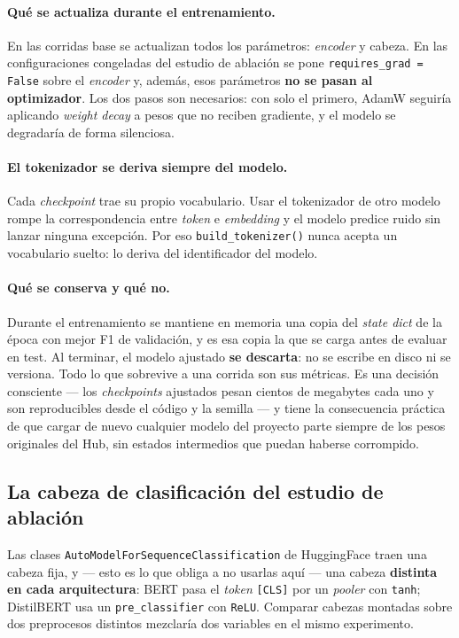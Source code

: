 \paragraph{Qué se actualiza durante el entrenamiento.} En las corridas base
se actualizan todos los parámetros: \textit{encoder} y cabeza. En las
configuraciones congeladas del estudio de ablación se pone
\texttt{requires\_grad = False} sobre el \textit{encoder} y, además, esos
parámetros \textbf{no se pasan al optimizador}. Los dos pasos son necesarios:
con solo el primero, AdamW seguiría aplicando \textit{weight decay} a pesos
que no reciben gradiente, y el modelo se degradaría de forma silenciosa.

\paragraph{El tokenizador se deriva siempre del modelo.} Cada
\textit{checkpoint} trae su propio vocabulario. Usar el tokenizador de otro
modelo rompe la correspondencia entre \textit{token} e \textit{embedding} y
el modelo predice ruido sin lanzar ninguna excepción. Por eso
\texttt{build\_tokenizer()} nunca acepta un vocabulario suelto: lo deriva del
identificador del modelo.

\paragraph{Qué se conserva y qué no.} Durante el entrenamiento se mantiene en
memoria una copia del \textit{state dict} de la época con mejor F1 de
validación, y es esa copia la que se carga antes de evaluar en test. Al
terminar, el modelo ajustado \textbf{se descarta}: no se escribe en disco ni
se versiona. Todo lo que sobrevive a una corrida son sus métricas. Es una
decisión consciente --- los \textit{checkpoints} ajustados pesan cientos de
megabytes cada uno y son reproducibles desde el código y la semilla --- y
tiene la consecuencia práctica de que cargar de nuevo cualquier modelo del
proyecto parte siempre de los pesos originales del Hub, sin estados
intermedios que puedan haberse corrompido.

\subsection{La cabeza de clasificación del estudio de ablación}

Las clases \texttt{AutoModelForSequenceClassification} de HuggingFace traen
una cabeza fija, y --- esto es lo que obliga a no usarlas aquí --- una cabeza
\textbf{distinta en cada arquitectura}: BERT pasa el \textit{token}
\texttt{[CLS]} por un \textit{pooler} con \texttt{tanh}; DistilBERT usa un
\texttt{pre\_classifier} con \texttt{ReLU}. Comparar cabezas montadas sobre
dos preprocesos distintos mezclaría dos variables en el mismo experimento.

